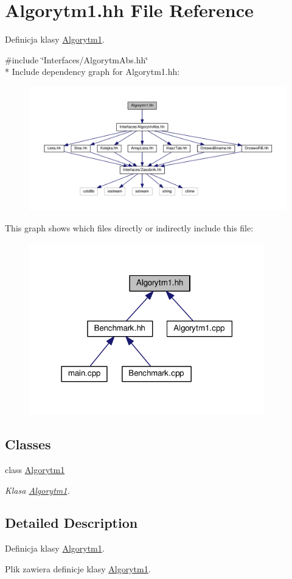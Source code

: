 \hypertarget{a00021}{}\section{Algorytm1.\+hh File Reference}
\label{a00021}


Definicja klasy \hyperlink{a00002}{Algorytm1}.  


{\ttfamily \#include \char`\"{}Interfaces/\+Algorytm\+Abs.\+hh\char`\"{}}\\*
Include dependency graph for Algorytm1.\+hh\+:
\nopagebreak
\begin{figure}[H]
\begin{center}
\leavevmode
\includegraphics[width=350pt]{a00061}
\end{center}
\end{figure}
This graph shows which files directly or indirectly include this file\+:
\nopagebreak
\begin{figure}[H]
\begin{center}
\leavevmode
\includegraphics[width=290pt]{a00062}
\end{center}
\end{figure}
\subsection*{Classes}
\begin{DoxyCompactItemize}
\item 
class \hyperlink{a00002}{Algorytm1}
\begin{DoxyCompactList}\small\item\em Klasa \hyperlink{a00002}{Algorytm1}. \end{DoxyCompactList}\end{DoxyCompactItemize}


\subsection{Detailed Description}
Definicja klasy \hyperlink{a00002}{Algorytm1}. 

Plik zawiera definicje klasy \hyperlink{a00002}{Algorytm1}. 